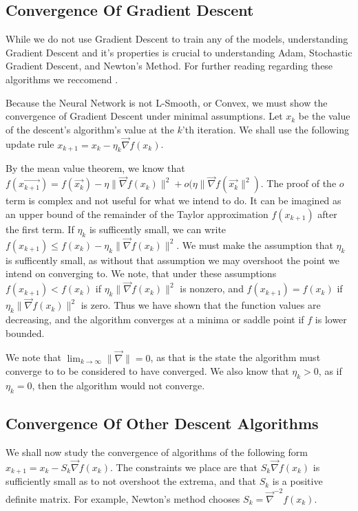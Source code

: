 \documentclass[10pt]{article}
\begin{document}
\subsection*{Convergence Of Gradient Descent}
While we do not use Gradient Descent to train any of the models, understanding Gradient Descent and it's properties is crucial to understanding Adam, Stochastic Gradient Descent, and Newton's Method. For further reading regarding these algorithms we reccomend \cite{garrigos_2023_handbook}.

Because the Neural Network is not L-Smooth, or Convex, we must show the convergence of Gradient Descent under minimal assumptions. Let $x_k$ be the value of the descent's algorithm's value at the $k$'th iteration. We shall use the following update rule $x_{k+1} = x_k - \eta_k\vec{\nabla}f(x_k)$.


By the mean value theorem, we know that $f(\vec{x_{k+1}}) = f(\vec{x_k}) - \eta \|\vec{\nabla}f(x_k)\|^2 + o(\eta\|\vec{\nabla}f(\vec{x_k}\|^2)$. The proof of the $o$ term is complex and not useful for what we intend to do. It can be imagined as an upper bound of the remainder of the Taylor approximation $f(x_{k+1})$ after the first term. If $\eta_k$ is sufficently small, we can write $f(x_{k+1}) \leq f(x_k) - \eta_k \|\vec{\nabla}f(x_k)\|^2$. We must make the assumption that $\eta_k$ is sufficently small, as without that assumption we may overshoot the point we intend on converging to. We note, that under these assumptions $f(x_{k+1}) < f(x_k)$ if $\eta_k \|\vec{\nabla}f(x_k)\|^2$ is nonzero, and $f(x_{k+1}) = f(x_k)$ if $\eta_k \|\vec{\nabla}f(x_k)\|^2$ is zero. Thus we have shown that the function values are decreasing, and the algorithm converges at a minima or saddle point if $f$ is lower bounded.

We note that $\lim_{k \to \infty} \|\vec{\nabla}\| = 0$, as that is the state the algorithm must converge to to be considered to have converged.
We also know that $\eta_k > 0$, as if $\eta_k = 0$, then the algorithm would not converge.

\subsection*{Convergence Of Other Descent Algorithms}

We shall now study the convergence of algorithms of the following form $x_{k+1} = x_k - S_k\vec{\nabla}f(x_k)$. The constraints we place are that $S_k\vec{\nabla}f(x_k)$ is sufficiently small as to not overshoot the extrema, and that $S_k$ is a positive definite matrix. For example, Newton's method chooses $S_k = \vec{\nabla}^{-2}f(x_k)$.
\end{document}
